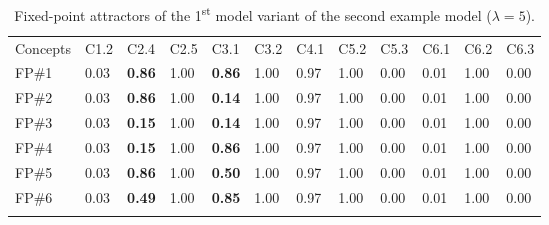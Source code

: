 \documentclass[graybox]{svmult}
\begin{document}
\begin{table}
\caption{Fixed-point attractors of the 1\textsuperscript{st} model variant of the second example model ($\lambda = 5$).}
\label{tab:BP2SpartialV1-FPs}
\begin{center}
\begin{tabular}{llllllllllll}
\hline\noalign{\smallskip}
Concepts & C1.2 & C2.4 & C2.5 & C3.1 & C3.2 & C4.1 & C5.2 & C5.3 & C6.1 & C6.2 & C6.3\\
\noalign{\smallskip}\svhline\noalign{\smallskip}
FP\#1 & 0.03 & \textbf{0.86} & 1.00 & \textbf{0.86} & 1.00 & 0.97 & 1.00 & 0.00 & 0.01 & 1.00 & 0.00\\
FP\#2 & 0.03 & \textbf{0.86} & 1.00 & \textbf{0.14} & 1.00 & 0.97 & 1.00 & 0.00 & 0.01 & 1.00 & 0.00\\
FP\#3 & 0.03 & \textbf{0.15} & 1.00 & \textbf{0.14} & 1.00 & 0.97 & 1.00 & 0.00 & 0.01 & 1.00 & 0.00\\
FP\#4 & 0.03 & \textbf{0.15} & 1.00 & \textbf{0.86} & 1.00 & 0.97 & 1.00 & 0.00 & 0.01 & 1.00 & 0.00\\
FP\#5 & 0.03 & \textbf{0.86} & 1.00 & \textbf{0.50} & 1.00 & 0.97 & 1.00 & 0.00 & 0.01 & 1.00 & 0.00\\
FP\#6 & 0.03 & \textbf{0.49} & 1.00 & \textbf{0.85} & 1.00 & 0.97 & 1.00 & 0.00 & 0.01 & 1.00 & 0.00\\
\noalign{\smallskip}\hline
\end{tabular}
\end{center}
\end{table}
\end{document}
